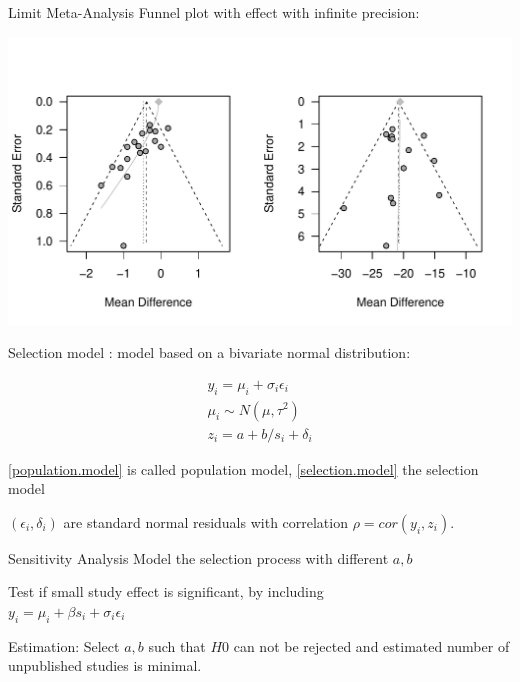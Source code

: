 \documentclass[english]{beamer}\usepackage[]{graphicx}\usepackage[]{color}
\makeatletter
\def\maxwidth{ %
  \ifdim\Gin@nat@width>\linewidth
    \linewidth
  \else
    \Gin@nat@width
  \fi
}
\newenvironment{knitrout}{}{} %
\makeatother
\begin{document}
\begin{frame}[fragile]{Limit Meta-Analysis}
Funnel plot with effect with infinite precision:

\vspace{-1.1cm}
\begin{knitrout}
\color{fgcolor}
\includegraphics[width=\maxwidth]{figure/unnamed-chunk-9-1} 

\end{knitrout}
\end{frame}



\begin{frame}{Selection model}
\citet{Copas1}: model based on a bivariate normal distribution:

\vspace{-8mm}
\begin{align}
y_{i} = \mu_{i} + \sigma_{i}\epsilon_{i} \label{population.model} \\
\mu_{i} \sim N(\mu, \tau^2) \label{population.model} \\
z_{i} = a + b/s_{i} + \delta_{i} \label{selection.model}
\end{align}

\ref{population.model} is called population model, \ref{selection.model} the selection model

$(\epsilon_{i}, \delta_{i})$ are standard normal residuals with correlation $\rho = cor(y_{i}, z_{i})$.
\end{frame}


\begin{frame}[fragile]{Sensitivity Analysis}
Model the selection process with different $a,b$

Test if small study effect is significant, by including \\ $y_{i} = \mu_{i} + \beta s_{i} + \sigma_{i}\epsilon_{i}$

Estimation: Select $a, b$ such that $H0$ can not be rejected and estimated
number of unpublished studies is minimal.
\end{frame}
\end{document}
